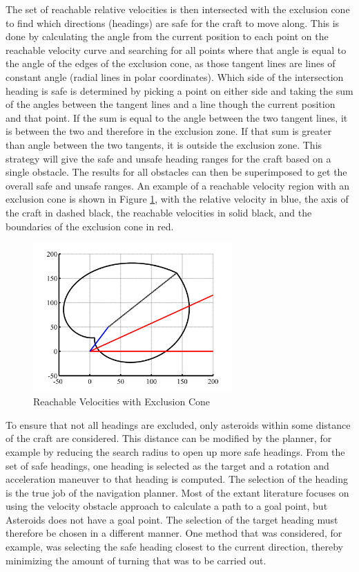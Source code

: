\documentclass[10pt,final,conference]{IEEEtran}
\begin{document}
The set of reachable relative velocities is then intersected with the exclusion cone to find which directions (headings) are safe for the craft to move along. This is done by calculating the angle from the current position to each point on the reachable velocity curve and searching for all points where that angle is equal to the angle of the edges of the exclusion cone, as those tangent lines are lines of constant angle (radial lines in polar coordinates). Which side of the intersection heading is safe is determined by picking a point on either side and taking the sum of the angles between the tangent lines and a line though the current position and that point. If the sum is equal to the angle between the two tangent lines, it is between the two and therefore in the exclusion zone. If that sum is greater than angle between the two tangents, it is outside the exclusion zone. This strategy will give the safe and unsafe heading ranges for the craft based on a single obstacle. The results for all obstacles can then be superimposed to get the overall safe and unsafe ranges. An example of a reachable velocity region with an exclusion cone is shown in Figure \ref{fig:reachable_veloc}, with the relative velocity in blue, the axis of the craft in dashed black, the reachable velocities in solid black, and the boundaries of the exclusion cone in red.

\begin{figure}[ht]
\centering
\includegraphics[width=3in]{./deltav_curve_rotated_translated_obstacle_color.png}
\caption{Reachable Velocities with Exclusion Cone}
\label{fig:reachable_veloc}
\end{figure}

To ensure that not all headings are excluded, only asteroids within some distance of the craft are considered. This distance can be modified by the planner, for example by reducing the search radius to open up more safe headings. From the set of safe headings, one heading is selected as the target and a rotation and acceleration maneuver to that heading is computed. The selection of the heading is the true job of the navigation planner. Most of the extant literature focuses on using the velocity obstacle approach to calculate a path to a goal point, but Asteroids does not have a goal point. The selection of the target heading must therefore be chosen in a different manner. One method that was considered, for example, was selecting the safe heading closest to the current direction, thereby minimizing the amount of turning that was to be carried out.
\end{document}

